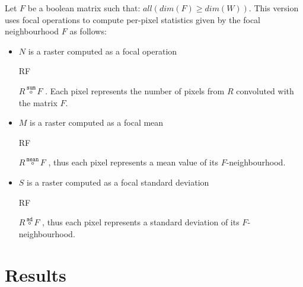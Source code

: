 \documentclass{itatnew}
\newcommand{\FOCALMMODE}[3]{
  #1{\stackrel{\mathtt{#3}}{\circ}}#2
}
\newcommand{\FOCAL}[3]{
  \ifmmode
  \FOCALMMODE{#1}{#2}{#3}
  \else
  \begin{math}\FOCALMMODE{#1}{#2}{#3}\end{math}%
  \fi
}
\begin{document}
\begin{definition}
  \label{def:FocalGetisOrdVersion}
  
  Let $F$ be a boolean matrix such that: $all(dim(F) \geq dim(W))$.
  This version uses focal operations to compute per-pixel statistics given by 
  the focal neighbourhood $F$ as follows:
  
  \begin{itemize}
    
    \item $N$ is a raster computed as a focal operation \FOCAL{R}{F}{sum}. Each
    pixel represents the number of pixels from $R$ convoluted with the matrix
    $F$. 
    
    \item $M$ is a raster computed as a focal mean \FOCAL{R}{F}{mean}, thus each
    pixel represents a mean value of its $F$-neighbourhood.
    
    \item $S$ is a raster computed as a focal standard deviation
    \FOCAL{R}{F}{sd}, thus each pixel represents a standard deviation of its
    $F$-neighbourhood.
    
  \end{itemize}
  
\end{definition}

\section{Results}
\end{document}
